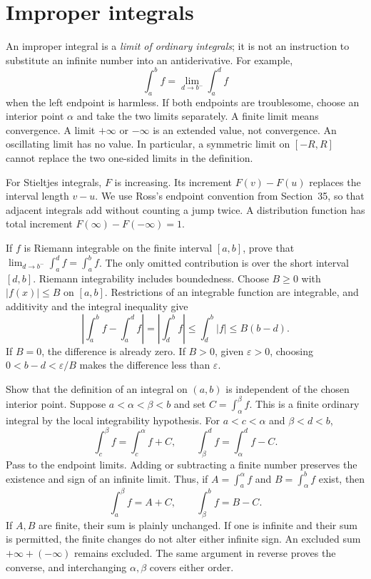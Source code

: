 \section{Improper integrals}
\label{sec:improper-integrals}
An improper integral is a \emph{limit of ordinary integrals}; it is not
an instruction to substitute an infinite number into an antiderivative.
For example,
\[
 \int_a^b f=\lim_{d\to b^-}\int_a^d f
\]
when the left endpoint is harmless. If both endpoints are troublesome,
choose an interior point $\alpha$ and take the two limits separately.
A finite limit means convergence. A limit $+\infty$ or $-\infty$ is an
extended value, not convergence. An oscillating limit has no value.
In particular, a symmetric limit on $[-R,R]$ cannot replace the two
one-sided limits in the definition.

For Stieltjes integrals, $F$ is increasing. Its increment
$F(v)-F(u)$ replaces the interval length $v-u$. We use Ross's
endpoint convention from Section~35, so that adjacent integrals add
without counting a jump twice. A distribution function has total
increment $F(\infty)-F(-\infty)=1$.

\goal If $f$ is Riemann integrable on the finite interval $[a,b]$,
prove that $\lim_{d\to b^-}\int_a^d f=\int_a^b f$.
\idea The only omitted contribution is over the short interval $[d,b]$.
Riemann integrability includes boundedness. Choose $B\geq0$ with
$|f(x)|\leq B$ on $[a,b]$. Restrictions of an integrable function are
integrable, and additivity and the integral inequality give
\[
 \left|\int_a^b f-\int_a^d f\right|
 =\left|\int_d^b f\right|\leq\int_d^b |f|
 \leq B(b-d).
\]
If $B=0$, the difference is already zero. If $B>0$, given
$\varepsilon>0$, choosing $0<b-d<\varepsilon/B$ makes the difference
less than $\varepsilon$.

\goal Show that the definition of an integral on $(a,b)$ is independent
of the chosen interior point.
Suppose $a<\alpha<\beta<b$ and set
$C=\int_\alpha^\beta f$. This is a finite ordinary integral by the
local integrability hypothesis. For $a<c<\alpha$ and $\beta<d<b$,
\[
 \int_c^\beta f=\int_c^\alpha f+C,
 \qquad
 \int_\beta^d f=\int_\alpha^d f-C.
\]
Pass to the endpoint limits. Adding or subtracting a finite number
preserves the existence and sign of an infinite limit. Thus, if
$A=\int_a^\alpha f$ and $B=\int_\alpha^b f$ exist, then
\[
 \int_a^\beta f=A+C,\qquad \int_\beta^b f=B-C.
\]
If $A,B$ are finite, their sum is plainly unchanged. If one is infinite
and their sum is permitted, the finite changes do not alter either
infinite sign. An excluded sum $+\infty+(-\infty)$ remains excluded.
The same argument in reverse proves the converse, and interchanging
$\alpha,\beta$ covers either order.

